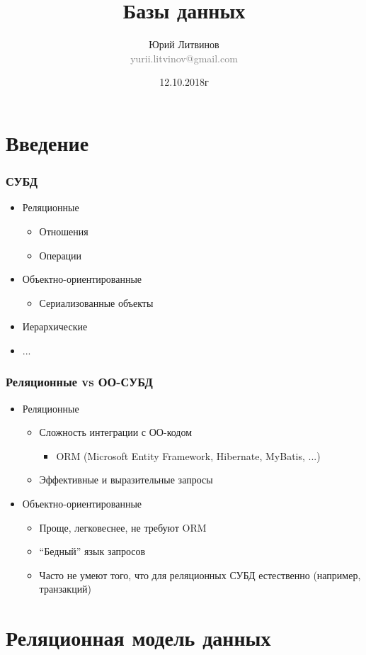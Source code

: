 \documentclass[xetex,mathserif,serif]{beamer}
\title{Базы данных}
\author[Юрий Литвинов]{Юрий Литвинов\\\small{\textcolor{gray}{yurii.litvinov@gmail.com}}}
\date{12.10.2018г}
\begin{document}
	\frame{\titlepage}

	\section{Введение}

	\begin{frame}
		\frametitle{СУБД}
		\begin{itemize}
			\item Реляционные
			\begin{itemize}
				\item Отношения
				\item Операции
			\end{itemize}
			\item Объектно-ориентированные
			\begin{itemize}
				\item Сериализованные объекты
			\end{itemize}
			\item Иерархические
			\item ...
		\end{itemize}
	\end{frame}

	\begin{frame}
		\frametitle{Реляционные vs ОО-СУБД}
		\begin{itemize}
			\item Реляционные
			\begin{itemize}
				\item Сложность интеграции с ОО-кодом
				\begin{itemize}
					\item ORM (Microsoft Entity Framework, Hibernate, MyBatis, ...)
				\end{itemize}
				\item Эффективные и выразительные запросы
			\end{itemize}
			\item Объектно-ориентированные
			\begin{itemize}
				\item Проще, легковеснее, не требуют ORM
				\item ``Бедный'' язык запросов
				\item Часто не умеют того, что для реляционных СУБД естественно (например, транзакций)
			\end{itemize}
		\end{itemize}
	\end{frame}

	\section{Реляционная модель данных}
\end{document}
